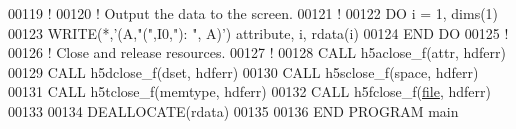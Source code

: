 \begin{DoxyCode}
00119   \textcolor{comment}{!}
00120   \textcolor{comment}{! Output the data to the screen.}
00121   \textcolor{comment}{!}
00122   \textcolor{keywordflow}{DO} i = 1, dims(1)
00123      \textcolor{keyword}{WRITE}(*,\textcolor{stringliteral}{'(A,"(",I0,"): ", A)'}) attribute, i, rdata(i)
00124 \textcolor{keywordflow}{  END DO}
00125   \textcolor{comment}{!}
00126   \textcolor{comment}{! Close and release resources.}
00127   \textcolor{comment}{!}
00128   \textcolor{keyword}{CALL }h5aclose\_f(attr, hdferr)
00129   \textcolor{keyword}{CALL }h5dclose\_f(dset, hdferr)
00130   \textcolor{keyword}{CALL }h5sclose\_f(space, hdferr)
00131   \textcolor{keyword}{CALL }h5tclose\_f(memtype, hdferr)
00132   \textcolor{keyword}{CALL }h5fclose\_f(\hyperlink{structfile}{file}, hdferr)
00133 
00134   \textcolor{keyword}{DEALLOCATE}(rdata)
00135 
00136 \textcolor{keyword}{END PROGRAM }main
\end{DoxyCode}
